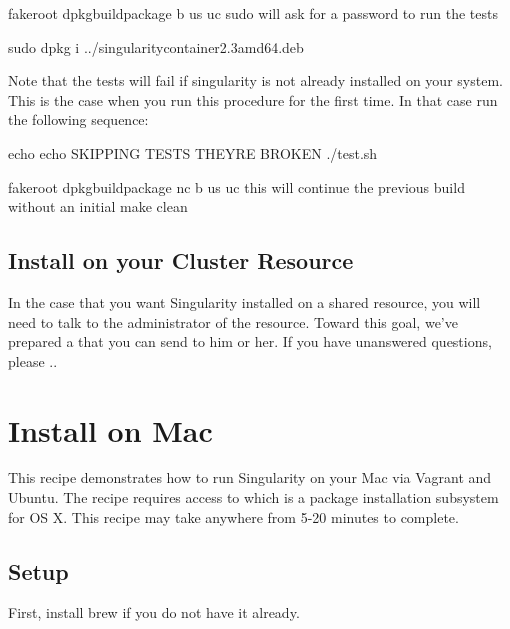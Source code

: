 \documentclass[letterpaper,10pt,english]{sphinxmanual}
\begin{document}
%
\begin{sphinxVerbatim}[commandchars=\\\{\}]
\PYGZdl{} fakeroot dpkg\PYGZhy{}buildpackage \PYGZhy{}b \PYGZhy{}us \PYGZhy{}uc \PYGZsh{} sudo will ask for a password to run the tests

\PYGZdl{} sudo dpkg \PYGZhy{}i ../singularity\PYGZhy{}container\PYGZus{}2.3\PYGZus{}amd64.deb
\end{sphinxVerbatim}

Note that the tests will fail if singularity is not already installed on your system. This is the case when you run this procedure for the first time. In that case run the following sequence:

%
\begin{sphinxVerbatim}[commandchars=\\\{\}]
\PYGZdl{} echo \PYGZdq{}echo SKIPPING TESTS THEYRE BROKEN\PYGZdq{} \PYGZgt{} ./test.sh

\PYGZdl{} fakeroot dpkg\PYGZhy{}buildpackage \PYGZhy{}nc \PYGZhy{}b \PYGZhy{}us \PYGZhy{}uc \PYGZsh{} this will continue the previous build without an initial \PYGZsq{}make clean\PYGZsq{}
\end{sphinxVerbatim}


\subsection{Install on your Cluster Resource}
\label{\detokenize{installation:install-on-your-cluster-resource}}
In the case that you want Singularity installed on a shared resource, you will need to talk to the administrator of the resource. Toward this goal, we’ve prepared a {\hyperref[\detokenize{installation:installation-request}]{}} that you can send to him or her. If you have unanswered questions, please ..


\section{Install on Mac}
\label{\detokenize{installation:install-on-mac}}
This recipe demonstrates how to run Singularity on your Mac via Vagrant and Ubuntu. The recipe requires access to  which is a package installation subsystem for OS X. This recipe may take anywhere from 5-20 minutes to complete.


\subsection{Setup}
\label{\detokenize{installation:id2}}
First, install brew if you do not have it already.
\end{document}
